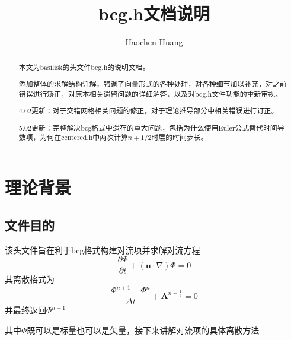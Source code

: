 \documentclass[lang=cn,11pt,a4paper]{elegantpaper}
\title{bcg.h文档说明}
\author{Haochen Huang}
\date{\zhtoday}
\begin{document}
\maketitle
\tableofcontents

\begin{abstract}
本文为basilisk的头文件bcg.h的说明文档。\par
添加整体的求解结构详解，强调了向量形式的各种处理，对各种细节加以补充，对之前错误进行矫正，对原本相关遗留问题的详细解答，以及对bcg.h文件功能的重新审视。\par
4.02更新：对于交错网格相关问题的修正，对于理论推导部分中相关错误进行订正。\par
5.02更新：完整解决bcg格式中遗存的重大问题，包括为什么使用Euler公式替代时间导数项，为何在centered.h中两次计算$n+1/2$时层的时间步长。
\end{abstract}


\section{理论背景}

\subsection{文件目的}
该头文件旨在利于bcg格式构建对流项并求解对流方程
\begin{equation}
    \frac{\partial \Phi}{\partial t} + ( \mathbf{u} \cdot \nabla) \Phi = 0
\end{equation}
其离散格式为
\begin{equation}
    \frac{\Phi^{n+1}-\Phi^{n}}{\Delta t} + \mathbf{A}^{n+ \frac{1}{2}}=0
\end{equation}
并最终返回$\Phi^{n+1}$\par
其中$\Phi$既可以是标量也可以是矢量，接下来讲解对流项的具体离散方法\par
\end{document}
